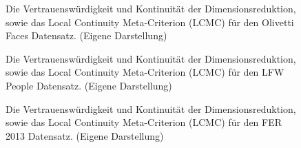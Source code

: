 \begin{figure}[ht]
	\begin{center}
		
	\end{center}
	\caption[Olivetti Faces Qualitätskriterien]{Die Vertrauenswürdigkeit und Kontinuität der Dimensionsreduktion, sowie das Local Continuity Meta-Criterion (LCMC) für den Olivetti Faces Datensatz. (Eigene Darstellung)}
	\label{fig:OlivettiFacesMetrics}
\end{figure}

\begin{figure}[ht]
	\begin{center}
		
	\end{center}
	\caption[LFW People Qualitätskriterien]{Die Vertrauenswürdigkeit und Kontinuität der Dimensionsreduktion, sowie das Local Continuity Meta-Criterion (LCMC) für den LFW People Datensatz. (Eigene Darstellung)}
	\label{fig:LfwPeopleMetrics}
\end{figure}

\begin{figure}[ht]
	\begin{center}
		
	\end{center}
	\caption[FER2013 Qualitätskriterien]{Die Vertrauenswürdigkeit und Kontinuität der Dimensionsreduktion, sowie das Local Continuity Meta-Criterion (LCMC) für den FER 2013 Datensatz. (Eigene Darstellung)}
	\label{fig:FER2013Metrics}
\end{figure}

